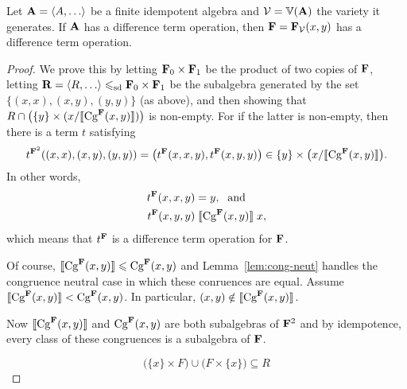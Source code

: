 \begin{theorem}
Let $\bA = \<A, \dots\>$ be a finite idempotent algebra and $\mathcal{V} = \operatorname{\mathbb{V}}(\mathbf{A})$ the
variety it generates.  If $\mathbf{A}$ has a difference term operation, then
$\mathbf{F} = \mathbf{F}_{\mathcal{V}}(x,y)$ has a difference term operation.
\end{theorem}
\begin{proof}
  
We prove this by 
letting $\mathbf{F}_0 \times \mathbf{F}_1$ be the product of two copies of $\mathbf{F}$,
letting $\bR = \<R, \dots\>  \sdp \bF_0 \times \bF_1$ be the subalgebra generated
by the set $\{(x, x), (x, y), (y, y)\}$ (as above), and then showing that
$R \cap \bigl(\{y\} \times (x/\llbracket \operatorname{Cg}^{\mathbf{F}}(x,y) \rrbracket)\bigr)$ is non-empty.  For if the latter is
non-empty, then there is a term $t$ satisfying
\[
t^{\mathbf{F}^2}((x,x),(x,y),(y,y)) =\bigl(t^{\mathbf{F}}(x,x,y), t^{\mathbf{F}}(x,y,y)\bigr) \in
\{y\} \times \bigl(x/\llbracket \operatorname{Cg}^{\mathbf{F}}(x,y) \rrbracket\bigr).
\]
In other words,
\begin{align}
t^{\mathbf{F}}(x,x,y) &= y, \; \text{ and }\label{eq:dt1}\\
t^{\mathbf{F}}(x,y,y) &\mathrel{\llbracket \operatorname{Cg}^{\mathbf{F}}(x,y) \rrbracket} x, \label{eq:dt2}
\end{align}
which means that $t^{\mathbf{F}}$ is a difference term operation for $\mathbf{F}$.

Of course, $\llbracket \operatorname{Cg}^{\mathbf{F}}(x,y) \rrbracket \leqslant \operatorname{Cg}^{\mathbf{F}}(x,y)$ and  
Lemma~\ref{lem:cong-neut} handles the congruence neutral case in which these
conruences are equal. %
Assume
$\llbracket \operatorname{Cg}^{\mathbf{F}}(x,y) \rrbracket < \operatorname{Cg}^{\mathbf{F}}(x,y)$. In particular,
$(x,y) \notin \llbracket \operatorname{Cg}^{\mathbf{F}}(x,y) \rrbracket$.

Now $\llbracket \operatorname{Cg}^{\mathbf{F}}(x,y) \rrbracket$ and $\operatorname{Cg}^{\mathbf{F}}(x,y)$ are both subalgebras of $\mathbf{F}^2$
and by idempotence, every class of these congruences is a subalgebra of $\mathbf{F}$.

\bigskip


\[\bigl( \{x\} \times F\bigr) \cup \bigl(F \times \{x\}\bigr) \subseteq R\]

\end{proof}

